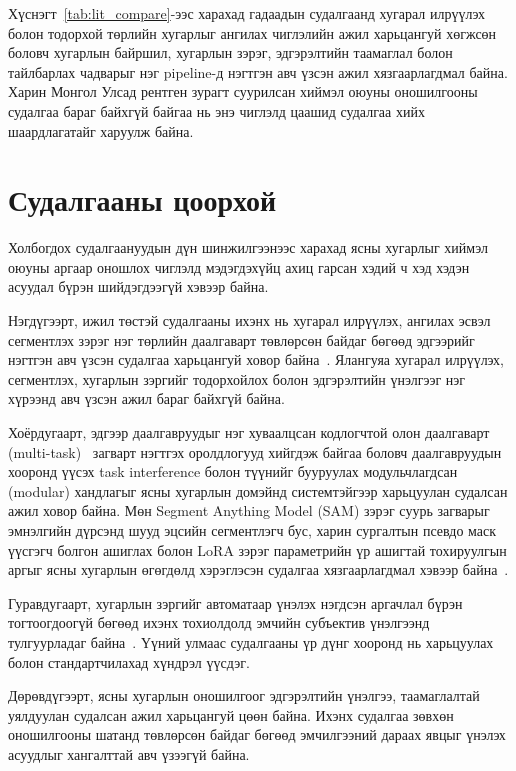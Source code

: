 Хүснэгт~\ref{tab:lit_compare}-ээс харахад гадаадын судалгаанд хугарал илрүүлэх болон тодорхой төрлийн хугарлыг ангилах чиглэлийн ажил харьцангуй хөгжсөн боловч хугарлын байршил, хугарлын зэрэг, эдгэрэлтийн таамаглал болон тайлбарлах чадварыг нэг pipeline-д нэгтгэн авч үзсэн ажил хязгаарлагдмал байна. Харин Монгол Улсад рентген зурагт суурилсан хиймэл оюуны оношилгооны судалгаа бараг байхгүй байгаа нь энэ чиглэлд цаашид судалгаа хийх шаардлагатайг харуулж байна.

\section{Судалгааны цоорхой}

Холбогдох судалгаануудын дүн шинжилгээнээс харахад ясны хугарлыг хиймэл оюуны аргаар оношлох чиглэлд мэдэгдэхүйц ахиц гарсан хэдий ч хэд хэдэн асуудал бүрэн шийдэгдээгүй хэвээр байна.

Нэгдүгээрт, ижил төстэй судалгааны ихэнх нь хугарал илрүүлэх, ангилах эсвэл сегментлэх зэрэг нэг төрлийн даалгаварт төвлөрсөн байдаг бөгөөд эдгээрийг нэгтгэн авч үзсэн судалгаа харьцангуй ховор байна~\cite{ref13}. Ялангуяа хугарал илрүүлэх, сегментлэх, хугарлын зэргийг тодорхойлох болон эдгэрэлтийн үнэлгээг нэг хүрээнд авч үзсэн ажил бараг байхгүй байна.

Хоёрдугаарт, эдгээр даалгавруудыг нэг хуваалцсан кодлогчтой олон даалгаварт (multi-task)~\cite{ref42} загварт нэгтгэх оролдлогууд хийгдэж байгаа боловч даалгавруудын хооронд үүсэх task interference болон түүнийг бууруулах модульчлагдсан (modular) хандлагыг ясны хугарлын домэйнд системтэйгээр харьцуулан судалсан ажил ховор байна. Мөн Segment Anything Model (SAM) зэрэг суурь загварыг эмнэлгийн дүрсэнд шууд эцсийн сегментлэгч бус, харин сургалтын псевдо маск үүсгэгч болгон ашиглах болон LoRA зэрэг параметрийн үр ашигтай тохируулгын аргыг ясны хугарлын өгөгдөлд хэрэглэсэн судалгаа хязгаарлагдмал хэвээр байна~\cite{ref15}.

Гуравдугаарт, хугарлын зэргийг автоматаар үнэлэх нэгдсэн аргачлал бүрэн тогтоогдоогүй бөгөөд ихэнх тохиолдолд эмчийн субъектив үнэлгээнд тулгуурладаг байна~\cite{ref14}. Үүний улмаас судалгааны үр дүнг хооронд нь харьцуулах болон стандартчилахад хүндрэл үүсдэг.

Дөрөвдүгээрт, ясны хугарлын оношилгоог эдгэрэлтийн үнэлгээ, таамаглалтай уялдуулан судалсан ажил харьцангуй цөөн байна. Ихэнх судалгаа зөвхөн оношилгооны шатанд төвлөрсөн байдаг бөгөөд эмчилгээний дараах явцыг үнэлэх асуудлыг хангалттай авч үзээгүй байна.

